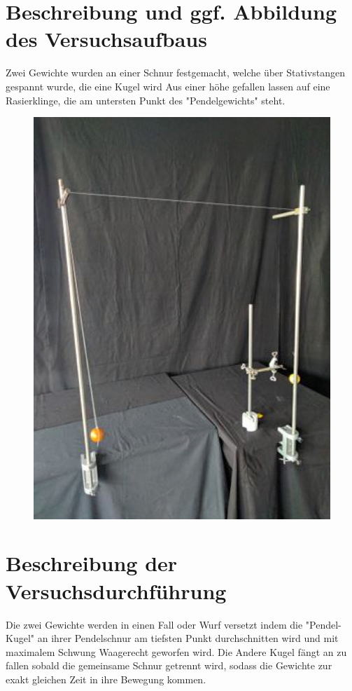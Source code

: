 \documentclass[12p]{article}
\begin{document}
\section*{Beschreibung und ggf. Abbildung des Versuchsaufbaus}
Zwei Gewichte wurden an einer Schnur festgemacht, welche über Stativstangen
gespannt wurde, die eine Kugel wird Aus einer höhe gefallen lassen auf eine
Rasierklinge, die am untersten Punkt des "Pendelgewichts" steht.
\begin{figure}[!h]
\includegraphics[scale=0.1]{versuch freier fall.jpeg}
\end{figure}

\section*{Beschreibung der Versuchsdurchführung}
Die zwei Gewichte werden in einen Fall oder Wurf  versetzt indem die "Pendel-Kugel" an
ihrer Pendelschnur am tiefsten Punkt durchschnitten wird und mit maximalem
Schwung Waagerecht geworfen wird. Die Andere Kugel fängt an zu fallen sobald die
gemeinsame Schnur getrennt wird, sodass die Gewichte zur exakt gleichen Zeit in
ihre Bewegung kommen.
\end{document}
